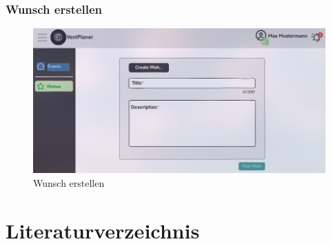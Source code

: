 \documentclass[a4paper,12pt]{article}
\begin{document}
\subsubsection{Wunsch erstellen}
\begin{figure}[H]
    \centering
    \includegraphics[width=1\textwidth]{Abbildungen/wishes/create_wish.png}
    \caption{Wunsch erstellen}
    \label{fig:create_wish}
\end{figure}

\newpage


\printglossaries

\newpage


\section{Literaturverzeichnis}
\end{document}
